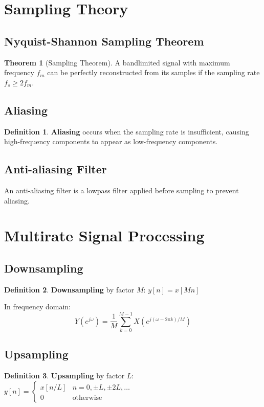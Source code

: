 \documentclass[11pt]{article}
\theoremstyle{definition}
\newtheorem{definition}{Definition}[section]
\newtheorem{theorem}{Theorem}[section]
\begin{document}
\section{Sampling Theory}

\subsection{Nyquist-Shannon Sampling Theorem}
\begin{theorem}[Sampling Theorem]
A bandlimited signal with maximum frequency $f_m$ can be perfectly reconstructed from its samples if the sampling rate $f_s \geq 2f_m$.
\end{theorem}

\subsection{Aliasing}
\begin{definition}
\textbf{Aliasing} occurs when the sampling rate is insufficient, causing high-frequency components to appear as low-frequency components.
\end{definition}

\subsection{Anti-aliasing Filter}
An anti-aliasing filter is a lowpass filter applied before sampling to prevent aliasing.

\section{Multirate Signal Processing}

\subsection{Downsampling}
\begin{definition}
\textbf{Downsampling} by factor $M$: $y[n] = x[Mn]$
\end{definition}

In frequency domain:
$$Y(e^{j\omega}) = \frac{1}{M} \sum_{k=0}^{M-1} X(e^{j(\omega-2\pi k)/M})$$

\subsection{Upsampling}
\begin{definition}
\textbf{Upsampling} by factor $L$: $y[n] = \begin{cases} x[n/L] & n = 0, \pm L, \pm 2L, \ldots \\ 0 & \text{otherwise} \end{cases}$
\end{definition}
\end{document}
